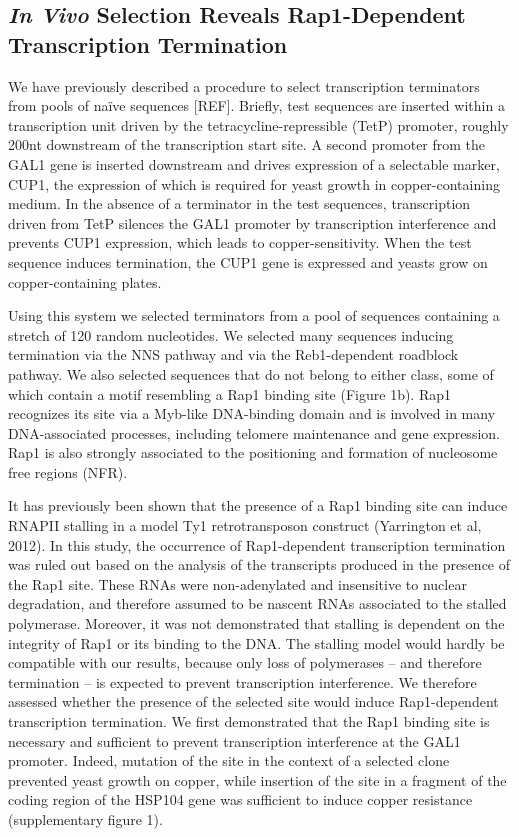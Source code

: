 \singlespacing
\subsection*{\textit{In Vivo} Selection Reveals Rap1-Dependent Transcription Termination}
\doublespacing

We have previously described a procedure to select transcription terminators from pools of naïve sequences [REF]. Briefly, test sequences are inserted within a transcription unit driven by the tetracycline-repressible (TetP) promoter, roughly 200nt downstream of the transcription start site. A second promoter from the GAL1 gene is inserted downstream and drives expression of a selectable marker, CUP1, the expression of which is required for yeast growth in copper-containing medium. In the absence of a terminator in the test sequences, transcription driven from TetP silences the GAL1 promoter by transcription interference and prevents CUP1 expression, which leads to copper-sensitivity. When the test sequence induces termination, the CUP1 gene is expressed and yeasts grow on copper-containing plates. 

Using this system we selected terminators from a pool of sequences containing a stretch of 120 random nucleotides. We selected many sequences inducing termination via the NNS pathway and via the Reb1-dependent roadblock pathway. We also selected sequences that do not belong to either class, some of which contain a motif resembling a Rap1 binding site (Figure 1b). Rap1 recognizes its site via a Myb-like DNA-binding domain and is involved in many DNA-associated processes, including telomere maintenance and gene expression. Rap1 is also strongly associated to the positioning and formation of nucleosome free regions (NFR). 

It has previously been shown that the presence of a Rap1 binding site can induce RNAPII stalling in a model Ty1 retrotransposon construct (Yarrington et al, 2012). In this study, the occurrence of Rap1-dependent transcription termination was ruled out based on the analysis of the transcripts produced in the presence of the Rap1 site. These RNAs were non-adenylated and insensitive to nuclear degradation, and therefore assumed to be nascent RNAs associated to the stalled polymerase. Moreover, it was not demonstrated that stalling is dependent on the integrity of Rap1 or its binding to the DNA.
The stalling model would hardly be compatible with our results, because only loss of polymerases – and therefore termination – is expected to prevent transcription interference. We therefore assessed whether the presence of the selected site would induce Rap1-dependent transcription termination. We first demonstrated that the Rap1 binding site is necessary and sufficient to prevent transcription interference at the GAL1 promoter. Indeed, mutation of the site in the context of a selected clone prevented yeast growth on copper, while insertion of the site in a fragment of the coding region of the HSP104 gene was sufficient to induce copper resistance (supplementary figure 1).  

